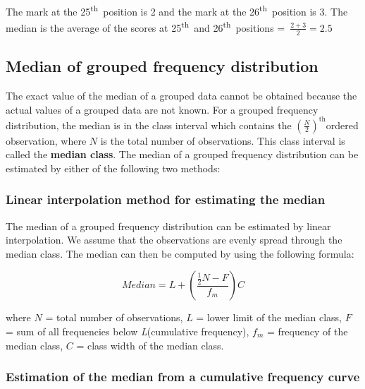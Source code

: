 \documentclass[
]{book}
\begin{document}
The mark at the 25\textsuperscript{th}~position is 2 and the mark at the 26\textsuperscript{th}~position
is 3. The median is the average of the scores at 25\textsuperscript{th}~and
26\textsuperscript{th}~positions =~\(\frac{2 + 3}{2} = 2.5\)

\hypertarget{median-of-grouped-frequency-distribution}{%
\subsection{Median of grouped frequency distribution}\label{median-of-grouped-frequency-distribution}}

The exact value of the median of a grouped data cannot be obtained
because the actual values of a grouped data are not known. For a grouped
frequency distribution, the median is in the class interval which
contains the \(\left( \frac{N}{2} \right)^{\text{th}}\)ordered
observation, where \(N\) is the total number of observations. This class
interval is called the \textbf{median class}. The median of a grouped
frequency distribution can be estimated by either of the following two
methods:

\hypertarget{linear-interpolation-method-for-estimating-the-median}{%
\subsubsection{Linear interpolation method for estimating the median}\label{linear-interpolation-method-for-estimating-the-median}}

The median of a grouped frequency distribution can be estimated by
linear interpolation. We assume that the observations are evenly spread
through the median class. The median can then be computed by using the
following formula:

\[Median = L + \left( \frac{\frac{1}{2}N - F}{f_{m}} \right)C\]

where \(N\) = total number of observations, \(L\) = lower limit of the
median class, \(F\) = sum of all frequencies below \emph{L}(cumulative
frequency), \(f_{m}\) = frequency of the median class, \(C\) = class width
of the median class.

\hypertarget{estimation-of-the-median-from-a-cumulative-frequency-curve}{%
\subsubsection{Estimation of the median from a cumulative frequency curve}\label{estimation-of-the-median-from-a-cumulative-frequency-curve}}
\end{document}
